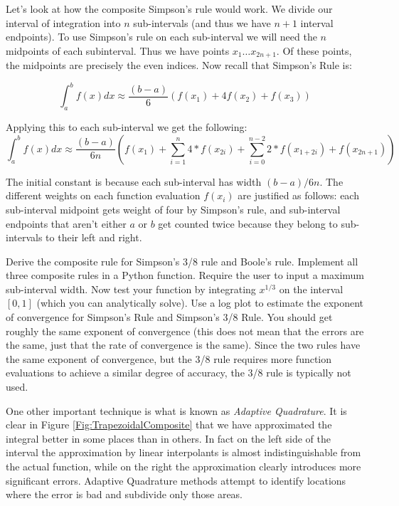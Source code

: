 Let's look at how the composite Simpson's rule would work.
We divide our interval of integration into $n$ sub-intervals (and thus we have $n+1$ interval endpoints).
To use Simpson's rule on each sub-interval we will need the $n$ midpoints of each subinterval.
Thus we have points $x_1 \ldots x_{2n+1}$.
Of these points, the midpoints are precisely the even indices.
Now recall that Simpson's Rule is:

\[
\int_a^b f(x) dx \approx \frac{(b-a)}{6}\left(f(x_1) + 4 f(x_2) + f(x_3)\right)
\]

Applying this to each sub-interval we get the following:
\[
\int_a^b f(x) dx \approx \frac{(b-a)}{6n}\left( f(x_1) + \sum_{i=1}^{n} 4*f(x_{2i}) + \sum_{i=0}^{n-2} 2*f(x_{1+2i}) + f(x_{2n+1})\right)
\]

The initial constant is because each sub-interval has width $(b-a)/6n$.
The different weights on each function evaluation $f(x_i)$ are justified as follows: each sub-interval midpoint gets weight of four by Simpson's rule, and sub-interval endpoints that aren't either $a$ or $b$ get counted twice because they belong to sub-intervals to their left and right.

\begin{problem}
Derive the composite rule for Simpson's 3/8 rule and Boole's rule.
Implement all three composite rules in a Python function.
Require the user to input a maximum sub-interval width.
Now test your function by integrating $x^{1/3}$ on the interval $[0,1]$ (which you can analytically solve).
Use a log plot to estimate the exponent of convergence for Simpson's Rule and Simpson's 3/8 Rule.
You should get roughly the same exponent of convergence (this does not mean that the errors are the same, just that the rate of convergence is the same).
Since the two rules have the same exponent of convergence, but the 3/8 rule requires more function evaluations to achieve a similar degree of accuracy, the 3/8 rule is typically not used.
\end{problem}

One other important technique is what is known as \emph{Adaptive Quadrature}.
It is clear in Figure \ref{Fig:TrapezoidalComposite} that we have approximated the integral better in some places than in others.
In fact on the left side of the interval the approximation by linear interpolants is almost indistinguishable from the actual function, while on the right the approximation clearly introduces more significant errors.
Adaptive Quadrature methods attempt to identify locations where the error is bad and subdivide only those areas.


